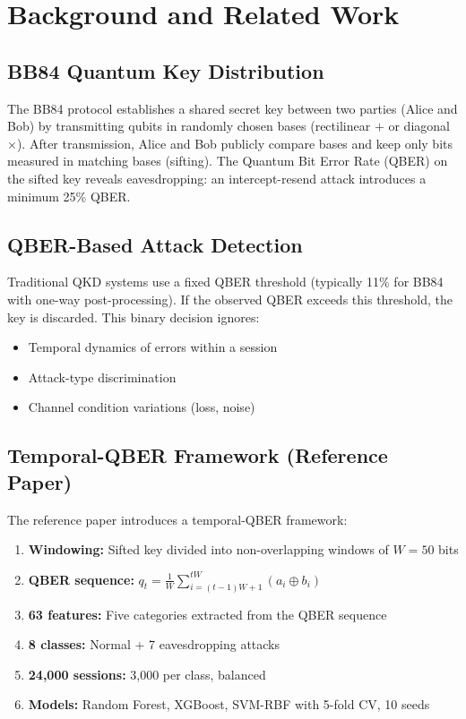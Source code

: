 \section{Background and Related Work}
\label{sec:background}

\subsection{BB84 Quantum Key Distribution}
The BB84 protocol establishes a shared secret key between two parties (Alice and Bob) by transmitting qubits in randomly chosen bases (rectilinear $+$ or diagonal $\times$). After transmission, Alice and Bob publicly compare bases and keep only bits measured in matching bases (sifting). The Quantum Bit Error Rate (QBER) on the sifted key reveals eavesdropping: an intercept-resend attack introduces a minimum 25\% QBER.

\subsection{QBER-Based Attack Detection}
Traditional QKD systems use a fixed QBER threshold (typically 11\% for BB84 with one-way post-processing). If the observed QBER exceeds this threshold, the key is discarded. This binary decision ignores:
\begin{itemize}
    \item Temporal dynamics of errors within a session
    \item Attack-type discrimination
    \item Channel condition variations (loss, noise)
\end{itemize}

\subsection{Temporal-QBER Framework (Reference Paper)}
The reference paper introduces a temporal-QBER framework:
\begin{enumerate}
    \item \textbf{Windowing:} Sifted key divided into non-overlapping windows of $W=50$ bits
    \item \textbf{QBER sequence:} $q_t = \frac{1}{W}\sum_{i=(t-1)W+1}^{tW} (a_i \oplus b_i)$
    \item \textbf{63 features:} Five categories extracted from the QBER sequence
    \item \textbf{8 classes:} Normal + 7 eavesdropping attacks
    \item \textbf{24,000 sessions:} 3,000 per class, balanced
    \item \textbf{Models:} Random Forest, XGBoost, SVM-RBF with 5-fold CV, 10 seeds
\end{enumerate}

